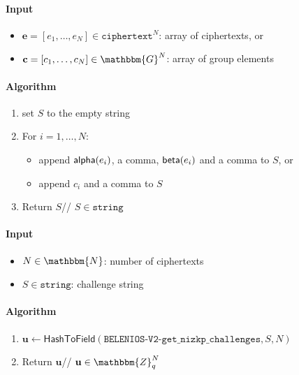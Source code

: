 \documentclass[a4paper]{article}
\newcommand{\dstprefix}{BELENIOS-V2}
\newcommand{\G}{\mathbbm{G}}
\newcommand{\Z}{\mathbbm{Z}}
\newcommand{\N}{\mathbbm{N}}
\newcommand{\jstring}{\texttt{string}}
\begin{document}
\begin{table}
  \begin{framed}
    \noindent\paragraph{Input}
    \begin{itemize}
    \item $\textbf{e}=[e_1,\dots,e_N]\in\texttt{ciphertext}^N$: array
      of ciphertexts, or
    \item $\textbf{c}=[c_1,\dots,c_N]\in\G^N$: array of group elements
    \end{itemize}
    \noindent\paragraph{Algorithm}
    \begin{enumerate}
    \item set $S$ to the empty string
    \item For $i=1,\dots,N$:
      \begin{itemize}
      \item append $\textsf{alpha}(e_i)$, a comma, $\textsf{beta}(e_i)$ and a comma to $S$, or\hfill
      \item append $c_i$ and a comma to $S$\hfill
      \end{itemize}
    \item Return $S$\hfill// $S\in\jstring$
    \end{enumerate}
  \end{framed}
  \caption{Functions $\llbracket\textbf{e}\rrbracket$ and $\llbracket\textbf{c}\rrbracket$}
  \label{serialize-array}
\end{table}

\begin{table}
  \begin{framed}
    \noindent\paragraph{Input}
    \begin{itemize}
    \item $N\in\N$: number of ciphertexts
    \item $S\in\jstring$: challenge string
    \end{itemize}
    \noindent\paragraph{Algorithm}
    \begin{enumerate}
    \item
      $\textbf{u}\leftarrow\textsf{HashToField}(\texttt{\dstprefix-get\_nizkp\_challenges},S,N)$
    \item Return $\textbf{u}$\hfill// $\textbf{u}\in\Z_q^N$
    \end{enumerate}
  \end{framed}
  \caption{Function $\mathsf{GetNIZKPChallenges}(N,S)$}
  \label{get-nizkp-challenges}
\end{table}
\end{document}
